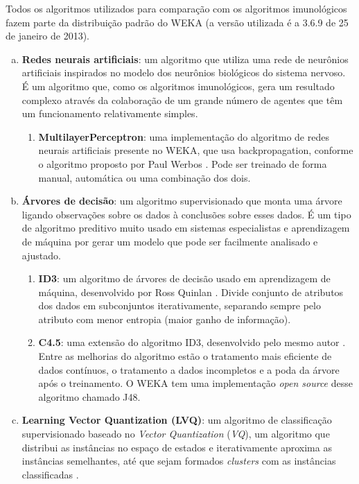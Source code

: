 Todos os algoritmos utilizados para comparação com os algoritmos imunológicos fazem parte da distribuição padrão do WEKA (a versão utilizada é a 3.6.9 de 25 de janeiro de 2013).

\begin{enumerate}[a)]
    \item \textbf{Redes neurais artificiais}: um algoritmo que utiliza uma rede de neurônios artificiais inspirados no modelo dos neurônios biológicos do sistema nervoso. É um algoritmo que, como os algoritmos imunológicos, gera um resultado complexo através da colaboração de um grande número de agentes que têm um funcionamento relativamente simples.
        \begin{enumerate}[1.]
            \item \textbf{MultilayerPerceptron}: uma implementação do algoritmo de redes neurais artificiais presente no WEKA, que usa backpropagation, conforme o algoritmo proposto por Paul Werbos \cite{Werbos1974}. Pode ser treinado de forma manual, automática ou uma combinação dos dois.
        \end{enumerate}
    \item \textbf{Árvores de decisão}: um algoritmo supervisionado que monta uma árvore ligando observações sobre os dados à conclusões sobre esses dados. É um tipo de algoritmo preditivo muito usado em sistemas especialistas e aprendizagem de máquina por gerar um modelo que pode ser facilmente analisado e ajustado.
        \begin{enumerate}[1.]
            \item \textbf{ID3}: um algoritmo de árvores de decisão usado em aprendizagem de máquina, desenvolvido por Ross Quinlan \cite{Quinlan1986}. Divide conjunto de atributos dos dados em subconjuntos iterativamente, separando sempre pelo atributo com menor entropia (maior ganho de informação).
            \item \textbf{C4.5}: uma extensão do algoritmo ID3, desenvolvido pelo mesmo autor \cite{Quinlan1993}. Entre as melhorias do algoritmo estão o tratamento mais eficiente de dados contínuos, o tratamento a dados incompletos e a poda da árvore após o treinamento. O WEKA tem uma implementação \emph{open source} desse algoritmo chamado J48.
        \end{enumerate}
    \item \textbf{Learning Vector Quantization (LVQ)}: um algoritmo de classificação supervisionado baseado no \emph{Vector Quantization} (\emph{VQ}), um algoritmo que distribui as instâncias no espaço de estados e iterativamente aproxima as instâncias semelhantes, até que sejam formados \emph{clusters} com as instâncias classificadas \cite{Kohonen1997}.

\end{enumerate}

